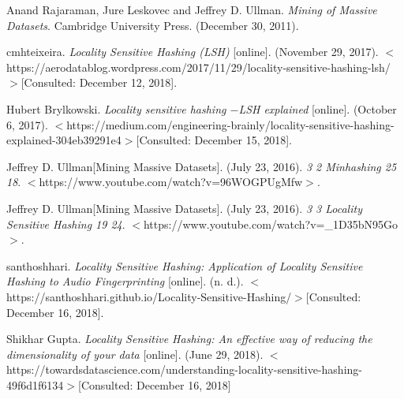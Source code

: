 \documentclass[12pt, a4paper]{article}
\begin{document}
\newpage
\begin{thebibliography}{9}
Anand Rajaraman, Jure Leskovec and Jeffrey D. Ullman. 
\textit{Mining of Massive Datasets}. Cambridge University Press. (December 30, 2011).
 
 cmhteixeira. \textit{Locality Sensitive Hashing (LSH)} [online]. (November 29, 2017). $<$https://aerodatablog.wordpress.com/2017/11/29/locality-sensitive-hashing-lsh/$>$[Consulted: December 12, 2018].
 
 Hubert Brylkowski. \textit{Locality sensitive hashing $-$LSH explained} [online]. (October 6, 2017). $<$https://medium.com/engineering-brainly/locality-sensitive-hashing-explained-304eb39291e4$>$[Consulted: December 15, 2018].
 
 Jeffrey D. Ullman[Mining Massive Datasets]. (July 23, 2016). \textit{3 2 Minhashing 25 18}. $<$https://www.youtube.com/watch?v=96WOGPUgMfw$>$.
 
 Jeffrey D. Ullman[Mining Massive Datasets]. (July 23, 2016). \textit{3 3 Locality Sensitive Hashing 19 24}. $<$https://www.youtube.com/watch?v=\_1D35bN95Go$>$.
 
 santhoshhari. \textit{Locality Sensitive Hashing: Application of Locality Sensitive Hashing to Audio Fingerprinting} [online]. (n. d.). $<$https://santhoshhari.github.io/Locality-Sensitive-Hashing/$>$[Consulted: December 16, 2018].
 
  Shikhar Gupta. \textit{Locality Sensitive Hashing: An effective way of reducing the dimensionality of your data} [online]. (June 29, 2018). $<$https://towardsdatascience.com/understanding-locality-sensitive-hashing-49f6d1f6134$>$[Consulted: December 16, 2018]
 
 
\end{thebibliography}
\end{document}
